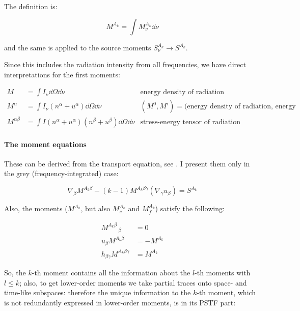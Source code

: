 \documentclass[main.tex]{subfiles}
\begin{document}
The definition is:

\begin{equation}
   M ^{A_k} = \int   M^{A_k} _\nu \dd{\nu}
\end{equation}

and the same is applied to the source moments \(S_\nu^{A_k} \rightarrow S^{A_k}\).

Since this includes the radiation intensity from all frequencies, we have direct interpretations for the first moments:

\begin{subequations}
\begin{align}
   M &= \int  I_\nu \dd{\Omega} \dd{\nu}   & \text{energy density of radiation}  \\
   M^\alpha &= \int I_\nu (n^\alpha + u^\alpha)\dd{\Omega} \dd{\nu}   & (M^0, M^i) = \text{(energy density of radiation, energy flux)}  \\
   M^{\alpha\beta} &= \int I (n^\alpha + u^\alpha)(n^\beta + u^\beta)\dd{\Omega} \dd{\nu}   & \text{stress-energy tensor of radiation}
\end{align}
\end{subequations}

\paragraph{The moment equations}

These can be derived from the transport equation, see \cite[3.14]{Thorne:1981feb}. I present them only in the grey (frequency-integrated) case:

\begin{equation} \label{eq:grey-moment-equations}
  \nabla_\beta M^{A_k \beta} - (k-1) M^{A_k \beta \gamma} (\nabla_ \gamma u_\beta)= S^{A_k}
\end{equation}

Also, the moments (\(M^{A_k}\), but also \(M^{A_k}_\nu\) and \(M^{A_k}_f\)) satisfy the following:

\begin{subequations}
\begin{align}
  M^{A_k \beta}\,_\beta &= 0 \\
  u_\beta M^{A_k \beta} &= -M^{A_k} \\
  h_{\beta \gamma} M^{A_k \beta \gamma} &= M^{A_k}
\end{align}
\end{subequations}

So, the \(k\)-th moment contains all the information about the \(l\)-th moments with \(l\leq k\); also, to get lower-order moments we take partial traces onto space- and time-like subspaces: therefore the unique information to the \(k\)-th moment, which is not redundantly expressed in lower-order moments, is in its PSTF part:
\end{document}
